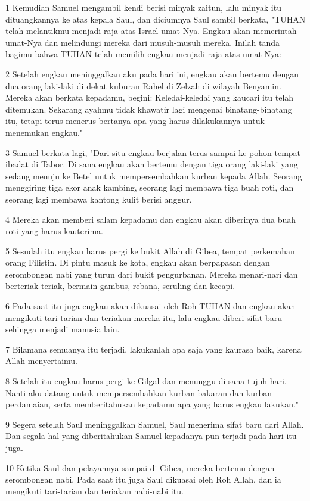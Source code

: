 \par 1 Kemudian Samuel mengambil kendi berisi minyak zaitun, lalu minyak itu dituangkannya ke atas kepala Saul, dan diciumnya Saul sambil berkata, "TUHAN telah melantikmu menjadi raja atas Israel umat-Nya. Engkau akan memerintah umat-Nya dan melindungi mereka dari musuh-musuh mereka. Inilah tanda bagimu bahwa TUHAN telah memilih engkau menjadi raja atas umat-Nya:
\par 2 Setelah engkau meninggalkan aku pada hari ini, engkau akan bertemu dengan dua orang laki-laki di dekat kuburan Rahel di Zelzah di wilayah Benyamin. Mereka akan berkata kepadamu, begini: Keledai-keledai yang kaucari itu telah ditemukan. Sekarang ayahmu tidak khawatir lagi mengenai binatang-binatang itu, tetapi terus-menerus bertanya apa yang harus dilakukannya untuk menemukan engkau."
\par 3 Samuel berkata lagi, "Dari situ engkau berjalan terus sampai ke pohon tempat ibadat di Tabor. Di sana engkau akan bertemu dengan tiga orang laki-laki yang sedang menuju ke Betel untuk mempersembahkan kurban kepada Allah. Seorang menggiring tiga ekor anak kambing, seorang lagi membawa tiga buah roti, dan seorang lagi membawa kantong kulit berisi anggur.
\par 4 Mereka akan memberi salam kepadamu dan engkau akan diberinya dua buah roti yang harus kauterima.
\par 5 Sesudah itu engkau harus pergi ke bukit Allah di Gibea, tempat perkemahan orang Filistin. Di pintu masuk ke kota, engkau akan berpapasan dengan serombongan nabi yang turun dari bukit pengurbanan. Mereka menari-nari dan berteriak-teriak, bermain gambus, rebana, seruling dan kecapi.
\par 6 Pada saat itu juga engkau akan dikuasai oleh Roh TUHAN dan engkau akan mengikuti tari-tarian dan teriakan mereka itu, lalu engkau diberi sifat baru sehingga menjadi manusia lain.
\par 7 Bilamana semuanya itu terjadi, lakukanlah apa saja yang kaurasa baik, karena Allah menyertaimu.
\par 8 Setelah itu engkau harus pergi ke Gilgal dan menunggu di sana tujuh hari. Nanti aku datang untuk mempersembahkan kurban bakaran dan kurban perdamaian, serta memberitahukan kepadamu apa yang harus engkau lakukan."
\par 9 Segera setelah Saul meninggalkan Samuel, Saul menerima sifat baru dari Allah. Dan segala hal yang diberitahukan Samuel kepadanya pun terjadi pada hari itu juga.
\par 10 Ketika Saul dan pelayannya sampai di Gibea, mereka bertemu dengan serombongan nabi. Pada saat itu juga Saul dikuasai oleh Roh Allah, dan ia mengikuti tari-tarian dan teriakan nabi-nabi itu.
